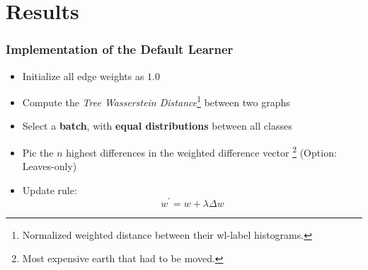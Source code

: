 \section{Results}

\begin{frame}
\frametitle{Implementation of the Default Learner}
	\begin{itemize}
		\item Initialize all edge weights as $1.0$
		\item Compute the \textit{Tree Wasserstein Distance}\footnote{Normalized weighted distance between their wl-label histograms.} between two graphs
		\item Select a \textbf{batch}, with \textbf{equal distributions} between all classes		
		\item Pic the \textbf{$n$} highest differences in the weighted difference vector \footnote{Most expensive earth that had to be moved.} (Option: Leaves-only)
		\item Update rule:
		\[ w^\prime = w + \lambda \Delta w\]
	\end{itemize}
\end{frame}

